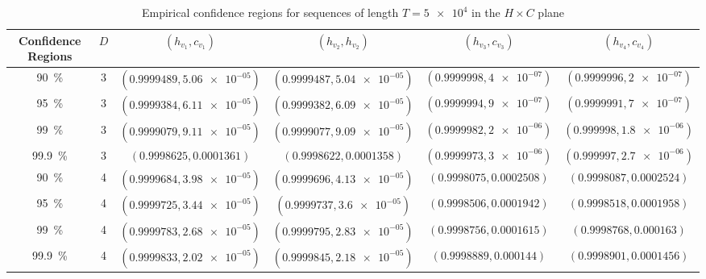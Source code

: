 \begin{sidewaystable}
    \caption{Empirical confidence regions for sequences of length $T = \num[scientific-notation=true]{5 e4}$ in the $H \times C$ plane}
    \label{Tab:Regions50k}
    \centering
    \begin{tabular}{cccccc}
    \toprule
    Confidence Regions & $D$ & $(h_{v_1}, c_{v_1})$ & $(h_{v_2}, h_{v_2})$ & $(h_{v_3}, c_{v_3})$ & $(h_{v_4},c_{v_4})$\\ 
    \midrule
    \SI{90}{\percent} & 3 & $(0.9999489, \num[scientific-notation=true]{5.06e-05})$ & $(0.9999487, \num[scientific-notation=true]{5.04e-05})$ & $(0.9999998, \num[scientific-notation=true]{4e-07})$ & $(0.9999996, \num[scientific-notation=true]{2e-07})$\\
    \SI{95}{\percent} & 3 & $(0.9999384, \num[scientific-notation=true]{6.11e-05})$ & $(0.9999382, \num[scientific-notation=true]{6.09e-05})$ & $(0.9999994, \num[scientific-notation=true]{9e-07})$ & $(0.9999991, \num[scientific-notation=true]{7e-07})$\\
    \SI{99}{\percent} & 3 & $(0.9999079, \num[scientific-notation=true]{9.11e-05})$ & $(0.9999077, \num[scientific-notation=true]{9.09e-05})$ & $(0.9999982, \num[scientific-notation=true]{2e-06})$ & $(0.999998, \num[scientific-notation=true]{1.8e-06})$\\
    \SI{99.9}{\percent} & 3 & $(0.9998625, 0.0001361)$ & $(0.9998622, 0.0001358)$ & $(0.9999973, \num[scientific-notation=true]{3e-06})$ & $(0.999997, \num[scientific-notation=true]{2.7e-06})$\\
    \cmidrule(lr){1-6}
    \SI{90}{\percent} & 4 & $(0.9999684, \num[scientific-notation=true]{3.98e-05})$ & $(0.9999696, \num[scientific-notation=true]{4.13e-05})$ & $(0.9998075, 0.0002508)$ & $(0.9998087, 0.0002524)$\\
    \SI{95}{\percent} & 4 & $(0.9999725, \num[scientific-notation=true]{3.44e-05})$ & $(0.9999737, \num[scientific-notation=true]{3.6e-05})$ & $(0.9998506, 0.0001942)$ & $(0.9998518, 0.0001958)$\\
    \SI{99}{\percent} & 4 & $(0.9999783, \num[scientific-notation=true]{2.68e-05})$ & $(0.9999795, \num[scientific-notation=true]{2.83e-05})$ & $(0.9998756, 0.0001615)$ & $(0.9998768, 0.000163)$\\
    \SI{99.9}{\percent} & 4 & $(0.9999833, \num[scientific-notation=true]{2.02e-05})$ & $(0.9999845, \num[scientific-notation=true]{2.18e-05})$ & $(0.9998889, 0.000144)$ & $(0.9998901, 0.0001456)$\\
    \cmidrule(lr){1-6}

\end{tabular}
\end{sidewaystable}
